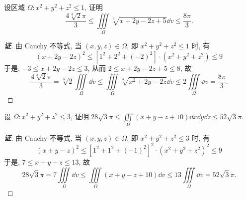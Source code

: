 \begin{example}[第十五届北京市数学竞赛]
    设区域 $\Omega:x^2+y^2+z^2\leqslant 1$, 证明
    $$\frac{4\sqrt[3]{2}\pi}{3}\leqslant \iiint\limits_\Omega\sqrt[3]{x+2y-2z+5}\dd v\leqslant \frac{8\pi}{3}.$$
\end{example}
\begin{proof}[{\songti \textbf{证}}]
    由 Cauchy 不等式, 当 $(x,y,z)\in\Omega$, 即 $x^2+y^2+z^2\leqslant 1$ 时, 有
    $$(x+2y-2z)^2\leqslant \left[1^2+2^2+(-2)^2\right]\cdot\left(x^2+y^2+z^2\right)\leqslant 9$$
    于是, $-3\leqslant x+2y-2z\leqslant 3$, 从而 $2\leqslant x+2y-2z+5\leqslant 8$, 故
    $$\frac{4\sqrt[3]{2}\pi}{3}=\sqrt[3]{2}\iiint\limits_\Omega\dd v\leqslant \iiint\limits_\Omega\sqrt[3]{x^2+2y-2z}\dd v\le2\iiint\limits_\Omega\dd v=\frac{8\pi}{3}.$$
\end{proof}

\begin{example}
    设 $\Omega:x^2+y^2+z^2\leqslant 3$, 证明 $\displaystyle 28\sqrt{3}\pi\leqslant\iiint\limits_\Omega(x+y-z+10)\dd x\dd y\dd z\leqslant 52\sqrt{3}\pi.$
\end{example}
\begin{proof}[{\songti \textbf{证}}]
    由 Cauchy 不等式, 当 $(x,y,z)\in\Omega$, 即 $x^2+y^2+z^2\leqslant 3$ 时, 有
    $$(x+y-z)^2\leqslant\left[1^2+1^2+(-1)^2\right]^2\cdot\left(x^2+y^2+z^2\right)^2\leqslant 9$$
    于是, $7\leqslant x+y-z\leqslant 13$, 故
    $$28\sqrt{3}\pi=7\iiint\limits_\Omega\dd v\leqslant\iiint\limits_\Omega(x+y-z+10)\dd v\leqslant 13\iiint\limits_\Omega\dd v=52\sqrt{3}\pi.$$
\end{proof}